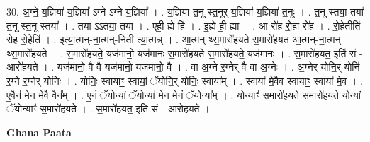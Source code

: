 \documentclass[17pt]{extarticle}
\begin{document}
30. अ॒ग्ने॒ य॒ज्ञिया॑ य॒ज्ञिया᳚ ऽग्ने ऽग्ने य॒ज्ञिया᳚ । . य॒ज्ञिया॑ त॒नू स्त॒नूर् य॒ज्ञिया॑ य॒ज्ञिया॑ त॒नूः । . त॒नू स्तया॒ तया॑ त॒नू स्त॒नू स्तया᳚ । . तया ऽऽतया॒ तया । . एही॒ ह्ये हि॑ । . इ॒ह्ये ही॒ ह्या । . आ रो॑ह रो॒हा रो॑ह । . रो॒हेतीति॑ रोह रो॒हेति॑ । . इत्या॒त्मन्-ना॒त्मन्-निती त्या॒त्मन्न् । . आ॒त्मन् थ्स॒मारो॑हयते स॒मारो॑हयत आ॒त्मन्-ना॒त्मन् थ्स॒मारो॑हयते । . स॒मारो॑हयते॒ यज॑मानो॒ यज॑मानः स॒मारो॑हयते स॒मारो॑हयते॒ यज॑मानः । . स॒मारो॑हयत॒ इति॑ सं - आरो॑हयते । . यज॑मानो॒ वै वै यज॑मानो॒ यज॑मानो॒ वै । . वा अ॒ग्ने र॒ग्नेर् वै वा अ॒ग्नेः । . अ॒ग्नेर् योनि॒र् योनि॑ र॒ग्ने र॒ग्नेर् योनिः॑ । . योनिः॒ स्वायाꣳ॒॒ स्वायां॒ ॅयोनि॒र् योनिः॒ स्वाया᳚म् । . स्वाया॑ मे॒वैव स्वायाꣳ॒॒ स्वाया॑ मे॒व । . ए॒वैन॑ मेन मे॒वै वैन᳚म् । . ए॒नं॒ ॅयोन्यां॒ ॅयोन्या॑ मेन मेनं॒ ॅयोन्या᳚म् । . योन्याꣳ॑ स॒मारो॑हयते स॒मारो॑हयते॒ योन्यां॒ ॅयोन्याꣳ॑ स॒मारो॑हयते । . स॒मारो॑हयत॒ इति॑ सं - आरो॑हयते । \newline

\textbf{Ghana Paata } \newline
\end{document}
